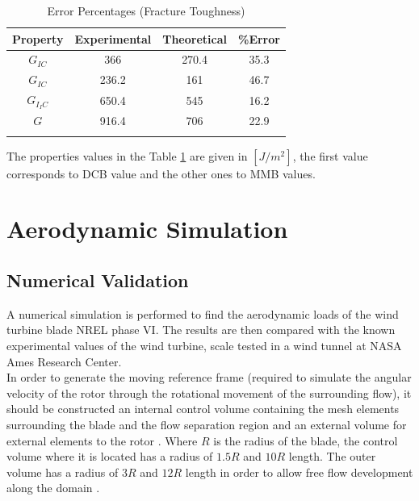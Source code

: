 \begin{table}[H]
\caption{Error Percentages (Fracture Toughness) \cite{zu} }  %
\label{tab:6}       %
\begin{center}
\begin{tabular}{cccc}
\hline\noalign{\smallskip}
Property & Experimental & Theoretical & {\%}Error \\
\hline\noalign{\smallskip}\hline\noalign{\smallskip}
$G_{IC}$  & 366 & 270.4 & 35.3  \\
$G_{IC}$  & 236.2 & 161 & 46.7 \\
$G_{I_IC}$  & 650.4 & 545 & 16.2\\
$G$  & 916.4 & 706 & 22.9\\
\noalign{\smallskip}\hline
\end{tabular}%
\end{center}%
\end{table}


The properties values in the Table \ref{tab:6} are given in $[J/m^2]$, the first value corresponds to DCB value and the other ones to MMB values.
\section{Aerodynamic Simulation}
\label{sec:4}
\subsection{Numerical Validation}

A numerical simulation is performed to find the aerodynamic loads of the wind turbine blade NREL phase VI. The results are then compared with the known experimental values of the wind turbine, scale tested in a wind tunnel at NASA Ames Research Center.\\

 In order to generate the moving reference frame (required to simulate the angular velocity of the rotor through the rotational movement of the surrounding flow), it should be constructed  an internal control volume containing the mesh elements surrounding the blade and the flow separation region and an external volume for external elements to the rotor \cite{lawson}. Where $R$ is the radius of the blade, the control volume where it is located has a radius of $1.5R$ and $10R$ length. The outer volume has a radius of $3R$ and $12R$ length in order to allow free flow development along the domain \cite{ijera}.\\

